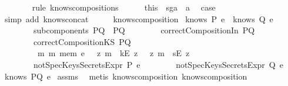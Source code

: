 \begin{isabellebody}
\ \ \ \ \ \ \isamarkupfalse%
\ {\isacharparenleft}rule\ knows{\isacharunderscore}composition{}{\isacharunderscore}s{\isacharparenright}\isanewline
\ \ \ \ \isamarkupfalse%
\ this\ \ sg{}a\ \ a{}\ \isamarkupfalse%
\ {\isacharquery}case\ \isamarkupfalse%
\ {\isacharparenleft}simp\ add{\isacharcolon}\ knows{\isacharunderscore}concat{\isacharunderscore}{}{\isacharparenright}\isanewline
\ \ \isamarkupfalse%
\ \isanewline
{}\isamarkupfalse%
%
\endisatagproof
{\isafoldproof}%
%
\isadelimproof
\isanewline
%
\endisadelimproof
\isanewline
{}\isamarkupfalse%
\ knows{\isacharunderscore}composition{}{\isacharcolon}\isanewline
{}\ {\isachardoublequoteopen}knows\ P\ e\ {\isasymor}\ knows\ Q\ e{\isachardoublequoteclose}\ \isanewline
\ \ \ \ \ \ \ \ {\isachardoublequoteopen}subcomponents\ PQ\ {\isacharequal}\ {\isacharbraceleft}P{\isacharcomma}Q{\isacharbraceright}{\isachardoublequoteclose}\isanewline
\ \ \ \ \ \ \ \ {\isachardoublequoteopen}correctCompositionIn\ PQ{\isachardoublequoteclose}\isanewline
\ \ \ \ \ \ \ \ {\isachardoublequoteopen}correctCompositionKS\ PQ{\isachardoublequoteclose}\isanewline
\ \ \ \ \ \ \ \ {\isachardoublequoteopen}{\isasymforall}\ m{\isachardot}\ m\ mem\ e\ {\isasymlongrightarrow}\ {\isacharparenleft}{\isacharparenleft}{\isasymexists}\ z{\isachardot}\ m\ {\isacharequal}\ kE\ z{\isacharparenright}\ {\isasymor}\ {\isacharparenleft}{\isasymexists}\ z{\isachardot}\ m\ {\isacharequal}\ sE\ z{\isacharparenright}{\isacharparenright}{\isachardoublequoteclose}\isanewline
\ \ \ \ \ \ \ \ {\isachardoublequoteopen}notSpecKeysSecretsExpr\ P\ e{\isachardoublequoteclose}\isanewline
\ \ \ \ \ \ \ \ {\isachardoublequoteopen}notSpecKeysSecretsExpr\ Q\ e{\isachardoublequoteclose}\ \isanewline
{}\ {\isachardoublequoteopen}knows\ PQ\ e{\isachardoublequoteclose}\isanewline
%
\isadelimproof
%
\endisadelimproof
%
\isatagproof
{}\isamarkupfalse%
\ assms\ \isamarkupfalse%
\ {\isacharparenleft}metis\ knows{\isacharunderscore}composition{}\ knows{\isacharunderscore}composition{}{\isacharparenright}%
\endisatagproof
{\isafoldproof}%
%
\isadelimproof
\isanewline
%
\endisadelimproof
%
\isadelimtheory
\isanewline
%
\endisadelimtheory
%
\isatagtheory
{}\isamarkupfalse%
%
\endisatagtheory
{\isafoldtheory}%
%
\isadelimtheory
%
\endisadelimtheory
\ \end{isabellebody}%
